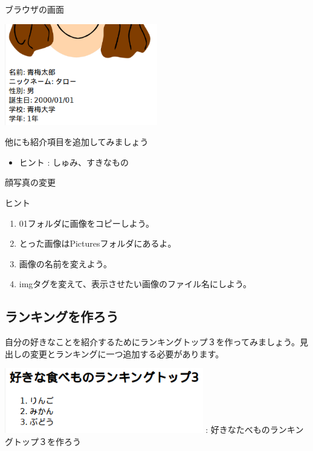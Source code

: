 \documentclass[a4paper,12pt]{jarticle}
\begin{document}
\bigskip

\bigskip



ブラウザの画面

\includegraphics[width=0.5\textwidth]{textbook-img173.png}



\clearpage
{}\theQuestion\label{Q:hasAnswer04-4}

他にも紹介項目を追加してみましょう

\begin{itemize}
  \item ヒント : しゅみ、すきなもの
\end{itemize}
\theQuestion\label{Q:hasAnswer04-5}

顔写真の変更

ヒント

\begin{enumerate}
  \item
        01フォルダに画像をコピーしよう。
  \item とった画像はPicturesフォルダにあるよ。
  \item 画像の名前を変えよう。
  \item
        imgタグを変えて、表示させたい画像のファイル名にしよう。
\end{enumerate}

\bigskip


\bigskip

\clearpage
{}
\subsection{\theExercise ランキングを作ろう}
自分の好きなことを紹介するためにランキングトップ３を作ってみましょう。見出しの変更とランキングに一つ追加する必要があります。



\bigskip


\begin{minipage}{\textwidth}
  {\upshape
    \includegraphics[width=0.65\textwidth]{textbook-img178.png}
    \newline
    :
    好きなたべものランキングトップ３を作ろう}
\end{minipage}
\end{document}
